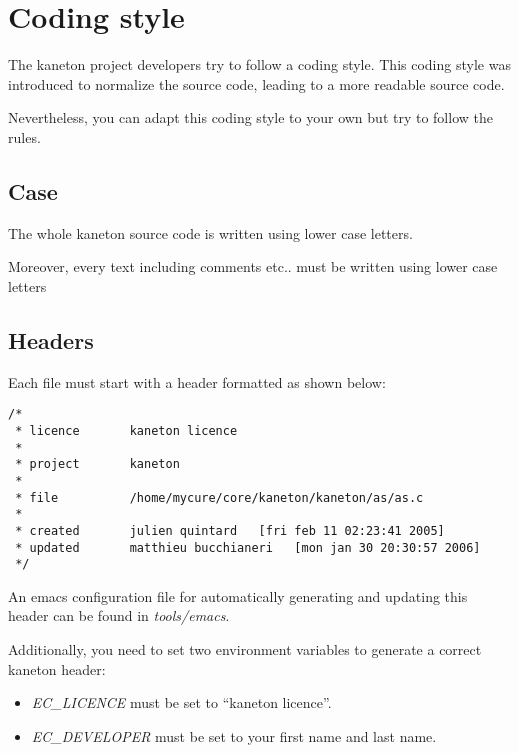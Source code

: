 
%
%

\chapter{Coding style}

The kaneton project developers try to follow a coding style. This
coding style was introduced to normalize the source code, leading to a
more readable source code.

Nevertheless, you can adapt this coding style to your own but try to
follow the rules.

%
%

\section{Case}

The whole kaneton source code is written using lower case letters.

Moreover, every text including comments etc.. must be written using
lower case letters

%
%

\section{Headers}

Each file must start with a header formatted as shown below:

\begin{verbatim}
/*
 * licence       kaneton licence
 *
 * project       kaneton
 *
 * file          /home/mycure/core/kaneton/kaneton/as/as.c
 *
 * created       julien quintard   [fri feb 11 02:23:41 2005]
 * updated       matthieu bucchianeri   [mon jan 30 20:30:57 2006]
 */
\end{verbatim}

An emacs configuration file for automatically generating and updating
this header can be found in \textit{tools/emacs}.

Additionally, you need to set two environment variables to generate
a correct kaneton header:

\begin{itemize}
  \item
    \textit{EC\_LICENCE} must be set to ``kaneton licence''.
  \item
    \textit{EC\_DEVELOPER} must be set to your first name and last name.
\end{itemize}

